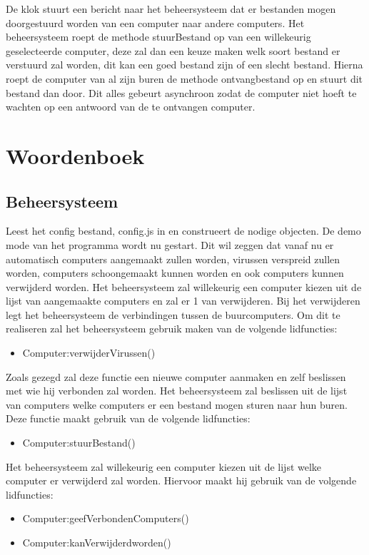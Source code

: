 \documentclass[a4paper,oneside]{report}
\begin{document}
De klok stuurt een bericht naar het beheersysteem dat er bestanden mogen doorgestuurd worden van een computer naar andere computers. Het beheersysteem roept de methode stuurBestand op van een willekeurig geselecteerde computer, deze zal dan een keuze maken welk soort bestand er verstuurd zal worden, dit kan een goed bestand zijn of een slecht bestand. Hierna roept de computer van al zijn buren de methode ontvangbestand op en stuurt dit bestand dan door. Dit alles gebeurt asynchroon zodat de computer niet hoeft te wachten op een antwoord van de te ontvangen computer.


\newpage
\section{Woordenboek}
\subsection{Beheersysteem}
 Leest het config bestand, config.js in en construeert de nodige objecten.
 De demo mode van het programma wordt nu gestart. Dit wil zeggen dat vanaf nu er automatisch computers aangemaakt zullen worden, virussen verspreid zullen worden, computers schoongemaakt kunnen worden en ook computers kunnen verwijderd worden.
 Het beheersysteem zal willekeurig een computer kiezen uit de lijst van aangemaakte computers en zal er 1 van verwijderen. Bij het verwijderen legt het beheersysteem de verbindingen tussen de buurcomputers. Om dit te realiseren zal het beheersysteem gebruik maken van de volgende lidfuncties:
\begin{itemize}
    \item Computer:verwijderVirussen()
\end{itemize}
 Zoals gezegd zal deze functie een nieuwe computer aanmaken en zelf beslissen met wie hij verbonden zal worden.
 Het beheersysteem zal beslissen uit de lijst van computers welke computers er een bestand mogen sturen naar hun buren. Deze functie maakt gebruik van de volgende lidfuncties:
\begin{itemize}
    \item Computer:stuurBestand()
\end{itemize}
 Het beheersysteem zal willekeurig een computer kiezen uit de lijst welke computer er verwijderd zal worden. Hiervoor maakt hij gebruik van de volgende lidfuncties:
\begin{itemize}
    \item Computer:geefVerbondenComputers()
    \item Computer:kanVerwijderdworden()
\end{itemize}
\end{document}
